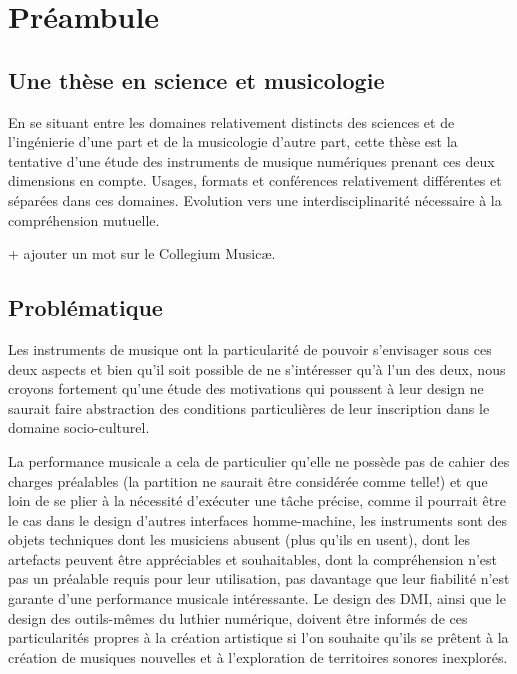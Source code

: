 %
\chapter{Préambule}
\label{ch:preamble}
%
%

\section{Une thèse en science et musicologie}

En se situant entre les domaines relativement distincts des sciences et de l'ingénierie d'une part et de la musicologie d'autre part, cette thèse est la tentative d'une étude des instruments de musique numériques prenant ces deux dimensions en compte.
Usages, formats et conférences relativement différentes et séparées dans ces domaines. 
Evolution vers une interdisciplinarité nécessaire à la compréhension mutuelle.

+ ajouter un mot sur le Collegium Musicæ.


\section{Problématique}

Les instruments de musique ont la particularité de pouvoir s'envisager sous ces deux aspects et bien qu'il soit possible de ne s'intéresser qu'à l'un des deux, nous croyons fortement qu'une étude des motivations qui poussent à leur design ne saurait faire abstraction des conditions particulières de leur inscription dans le domaine socio-culturel.

La performance musicale a cela de particulier qu'elle ne possède pas de cahier des charges préalables (la partition ne saurait être considérée comme telle!) et que loin de se plier à la nécessité d'exécuter une tâche précise, comme il pourrait être le cas dans le design d'autres interfaces homme-machine, les instruments sont des objets techniques dont les musiciens abusent (plus qu'ils en usent), dont les artefacts peuvent être appréciables et souhaitables, dont la compréhension n'est pas un préalable requis pour leur utilisation, pas davantage que leur fiabilité n'est garante d'une performance musicale intéressante.
%
Le design des DMI, ainsi que le design des outils-mêmes du luthier numérique, doivent être informés de ces particularités propres à la création artistique si l'on souhaite qu'ils se prêtent à la création de musiques nouvelles et à l'exploration de territoires sonores inexplorés.

